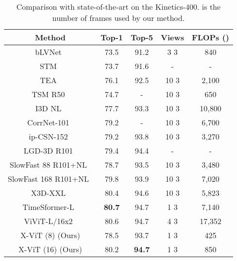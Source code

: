 \documentclass{article}
\begin{document}
\begin{table}[ht!]
    \caption{Comparison with state-of-the-art on the Kinetics-400.  is the number of frames used by our method.}\label{tab:k400-sota}
    
    \centering
    \begin{tabular}{ccccc}
        \toprule
       Method &  Top-1 & Top-5 & Views & FLOPs () \\
       \midrule
       bLVNet~\citep{fan2019more} & 73.5 & 91.2 & 3  3 & 840\\
       STM~\citep{jiang2019stm} & 73.7 & 91.6 & - & - \\
       TEA~\citep{li2020tea} & 76.1 & 92.5 & 10  3 & 2,100 \\
       TSM R50~\citep{lin2019tsm} & 74.7 & - & 10  3 & 650 \\
       I3D NL~\citep{wang2018non} & 77.7 & 93.3 & 10  3 &  10,800 \\
       CorrNet-101~\citep{wang2020video} & 79.2 & - & 10  3 &  6,700 \\
       ip-CSN-152~\citep{tran2019video} & 79.2 & 93.8 & 10  3 &  3,270 \\
       LGD-3D R101~\citep{qiu2019learning} & 79.4 & 94.4 & - & - \\
       SlowFast 88 R101+NL~\citep{feichtenhofer2019slowfast} & 78.7 & 93.5 & 10  3 &  3,480 \\
       SlowFast 168 R101+NL~\citep{feichtenhofer2019slowfast} & 79.8 & 93.9 & 10  3 &  7,020 \\
       X3D-XXL~\citep{feichtenhofer2020x3d} & 80.4 & 94.6 & 10  3 &  5,823 \\
       TimeSformer-L~\citep{bertasius2021space} & \textbf{80.7} & 94.7 & 1  3 & 7,140 \\
       ViViT-L/16x2~\citep{bertasius2021space} & 80.6 & 94.7 & 4  3 & 17,352 \\
       \midrule
       X-ViT (8) (Ours) & 78.5 & 93.7 & 1  3 & 425 \\
       X-ViT (16) (Ours) & 80.2 & \textbf{94.7} & 1  3 & 850 \\
        \bottomrule
    \end{tabular}

\end{table}
\end{document}
